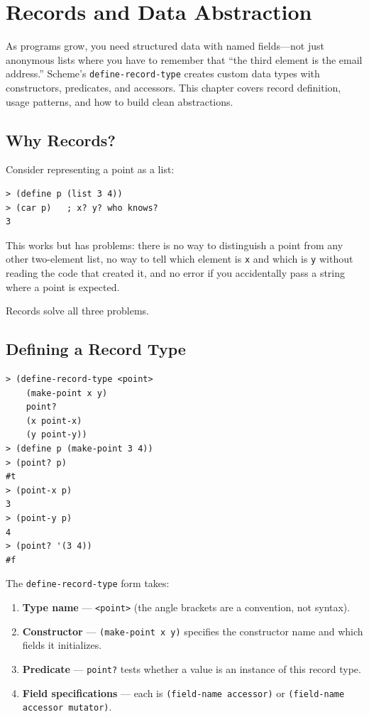 \chapter{Records and Data Abstraction}

As programs grow, you need structured data with named fields---not just anonymous lists where you have to remember that ``the third element is the email address.'' Scheme's \texttt{define-record-type} creates custom data types with constructors, predicates, and accessors. This chapter covers record definition, usage patterns, and how to build clean abstractions.

\section{Why Records?}

Consider representing a point as a list:

\begin{lstlisting}[style=repl]
> (define p (list 3 4))
> (car p)   ; x? y? who knows?
3
\end{lstlisting}

This works but has problems: there is no way to distinguish a point from any other two-element list, no way to tell which element is \texttt{x} and which is \texttt{y} without reading the code that created it, and no error if you accidentally pass a string where a point is expected.

Records solve all three problems.

\section{Defining a Record Type}

\begin{lstlisting}[style=repl]
> (define-record-type <point>
    (make-point x y)
    point?
    (x point-x)
    (y point-y))
> (define p (make-point 3 4))
> (point? p)
#t
> (point-x p)
3
> (point-y p)
4
> (point? '(3 4))
#f
\end{lstlisting}

The \texttt{define-record-type} form takes:

\begin{enumerate}
    \item \textbf{Type name} --- \texttt{<point>} (the angle brackets are a convention, not syntax).
    \item \textbf{Constructor} --- \texttt{(make-point x y)} specifies the constructor name and which fields it initializes.
    \item \textbf{Predicate} --- \texttt{point?} tests whether a value is an instance of this record type.
    \item \textbf{Field specifications} --- each is \texttt{(field-name accessor)} or \texttt{(field-name accessor mutator)}.
\end{enumerate}

